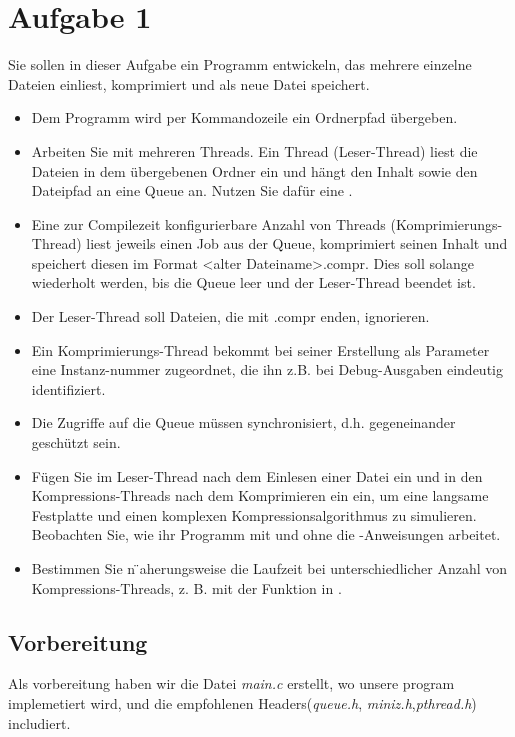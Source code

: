 \section{Aufgabe 1}
Sie sollen in dieser Aufgabe ein Programm entwickeln, das mehrere einzelne Dateien einliest,
komprimiert und als neue Datei speichert.
\begin{itemize}
	\item Dem Programm wird per Kommandozeile ein Ordnerpfad übergeben.
	\item Arbeiten Sie mit mehreren Threads. Ein Thread (Leser-Thread) liest die Dateien in dem
	übergebenen Ordner ein und hängt den Inhalt sowie den Dateipfad an eine Queue an.
	Nutzen Sie dafür eine .
	\item Eine zur Compilezeit konfigurierbare Anzahl von Threads (Komprimierungs-Thread) liest
	jeweils einen Job aus der Queue, komprimiert seinen Inhalt und speichert diesen
	im Format <alter Dateiname>.compr. Dies soll solange wiederholt werden,
	bis die Queue leer und der Leser-Thread beendet ist.
	\item Der Leser-Thread soll Dateien, die mit .compr enden, ignorieren.
	\item Ein Komprimierungs-Thread bekommt bei seiner Erstellung als Parameter eine
	Instanz-nummer zugeordnet, die ihn z.B. bei Debug-Ausgaben eindeutig identifiziert.
	\item Die Zugriffe auf die Queue müssen synchronisiert, d.h. gegeneinander geschützt sein.
	\item  Fügen Sie im Leser-Thread nach dem Einlesen einer Datei ein  und in den
	Kompressions-Threads nach dem Komprimieren ein   ein, um eine langsame Festplatte
	und einen komplexen Kompressionsalgorithmus zu simulieren. Beobachten Sie, wie ihr Programm mit
	und ohne die -Anweisungen arbeitet.
	\item Bestimmen Sie n ̈aherungsweise die Laufzeit bei unterschiedlicher Anzahl von
	Kompressions-Threads, z. B. mit der Funktion  in .

\end{itemize}
	\subsection{Vorbereitung}
	Als vorbereitung haben wir die Datei \textit{main.c} erstellt, wo unsere program implemetiert wird,
	und die empfohlenen Headers(\textit{queue.h}, \textit{miniz.h},\textit{pthread.h}) includiert.
